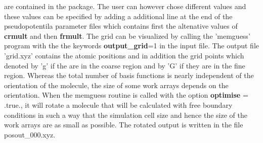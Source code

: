 \documentclass[a4paper,11pt]{report}
\begin{document}
are contained in the package. The user can however chose different values and these values can be specified by 
adding a additional line at the end of the pseudopotentila parameter files which contains first the altenative 
values of {\bf crmult} and then {\bf frmult}. The grid can be visualized by calling the 'memguess' program 
with the the keywords {\bf output\_grid}=1 in the input file. The output file 'grid.xyz' contains the atomic positions and in addition 
the grid points which denoted by 'g' if the are in the coarse region and by 'G' if they are in the fine region. 
Whereas the total number of basis functions is nearly independent of the orientation of the molecule, the size of some 
work arrays depends on the orientation. When the memguess routine is called with the option {\bf optimise} = .true., it will rotate 
a molecule that will be calculated with free boundary conditions in such a way that the simulation cell size and 
hence the size of the work arrays are as small as 
possible. The rotated output is written in the file posout\_000.xyz.
\end{document}
